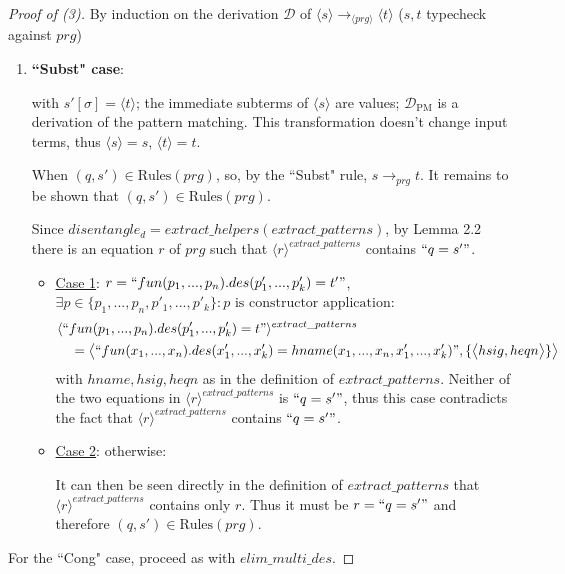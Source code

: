 \documentclass[11pt]{article} %
\begin{document}
\begin{proof}[Proof of (3)] By induction on the derivation $\mathcal{D}$ of $\langle s \rangle \longrightarrow_{\langle prg \rangle} \langle t \rangle$ ($s,t$ typecheck against $prg$)

\begin{enumerate}
\item \textbf{``Subst" case}:

\begin{prooftree}
\end{prooftree}

with $s'[\sigma] = \langle t \rangle$; the immediate subterms of $\langle s \rangle$ are values; $\mathcal{D}_{\textrm{PM}}$ is a derivation of the pattern matching. This transformation doesn't change input terms, thus $\langle s \rangle = s$, $\langle t \rangle = t$.

When $(q, s') \in \textrm{Rules}(prg)$, so, by the ``Subst" rule, $s \longrightarrow_{prg} t$. It remains to be shown that $(q, s') \in \textrm{Rules}(prg)$.

Since $disentangle_d = extract\_helpers(extract\_patterns)$, by Lemma 2.2 there is an equation $r$ of $prg$ such that $\langle r \rangle^{extract\_patterns}$ contains $`` q = s' "$.

\begin{itemize}

\item \underline{Case 1}: $r = `` fun(p_1, ..., p_n).des(p'_1, ..., p'_k) = t' " $, $\exists p \in \{p_1, ..., p_n, p'_1, ..., p'_k\}: p \textrm{ is constructor application}$:
\begin{alignat*}{3}
&\langle `` fun(p_1, ..., p_n).des(p'_1, ..., p'_k) = t " \rangle^{extract\_patterns} \\
&\quad = \big\langle `` fun(x_1, ..., x_n).des(x'_1, ..., x'_k) = hname(x_1, ..., x_n, x'_1, ..., x'_k) ", \{\big\langle hsig, heqn \big\rangle\} \big\rangle
\end{alignat*}
with $hname, hsig, heqn$ as in the definition of $extract\_patterns$. Neither of the two equations in $\langle r \rangle^{extract\_patterns}$ is $`` q = s' "$, thus this case contradicts the fact that $\langle r \rangle^{extract\_patterns}$ contains $`` q = s' "$.

\item \underline{Case 2}: otherwise:

It can then be seen directly in the definition of $extract\_patterns$ that $\langle r \rangle^{extract\_patterns}$ contains only $r$. Thus it must be $r = `` q = s' "$ and therefore $(q, s') \in \textrm{Rules}(prg)$.

\end{itemize}

\end{enumerate}

For the ``Cong" case, proceed as with $elim\_multi\_des$.

\end{proof}
\end{document}
